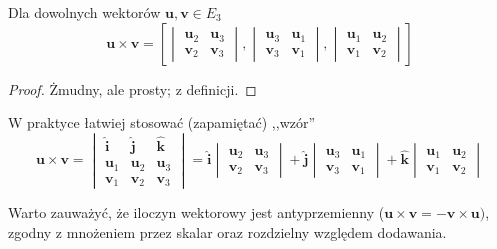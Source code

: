 \begin{theorem}
    Dla dowolnych wektorów $\symbf{u}, \symbf{v} \in E_3$
    \[ \symbf{u} \times \symbf{v} = \left[\begin{vmatrix}
        \symbf{u}_2 & \symbf{u}_3 \\
        \symbf{v}_2 & \symbf{v}_3
    \end{vmatrix}, \begin{vmatrix}
        \symbf{u}_3 & \symbf{u}_1 \\
        \symbf{v}_3 & \symbf{v}_1
    \end{vmatrix}, \begin{vmatrix}
        \symbf{u}_1 & \symbf{u}_2 \\
        \symbf{v}_1 & \symbf{v}_2
    \end{vmatrix}\right]\]
\end{theorem}
\begin{proof}
    Żmudny, ale prosty; z definicji.
\end{proof}

W praktyce łatwiej stosować (zapamiętać) ,,wzór''
\begin{equation} \label{eq:easy cross product}
    \symbf{u} \times \symbf{v} = \begin{vmatrix}
        \symbf{\hat{i}} & \symbf{\hat{j}} & \symbf{\hat{k}} \\
        \symbf{u}_1 & \symbf{u}_2 & \symbf{u}_3 \\
        \symbf{v}_1 & \symbf{v}_2 & \symbf{v}_3
    \end{vmatrix} = \symbf{\hat{i}}\begin{vmatrix}
        \symbf{u}_2 & \symbf{u}_3 \\
        \symbf{v}_2 & \symbf{v}_3
    \end{vmatrix} + \symbf{\hat{j}}\begin{vmatrix}
        \symbf{u}_3 & \symbf{u}_1 \\
        \symbf{v}_3 & \symbf{v}_1
    \end{vmatrix} + \symbf{\hat{k}}\begin{vmatrix}
        \symbf{u}_1 & \symbf{u}_2 \\
        \symbf{v}_1 & \symbf{v}_2
    \end{vmatrix}
\end{equation}

Warto zauważyć, że iloczyn wektorowy jest antyprzemienny ($\symbf{u} \times \symbf{v} = -\symbf{v} \times \symbf{u})$, zgodny z mnożeniem przez skalar oraz rozdzielny względem dodawania.

